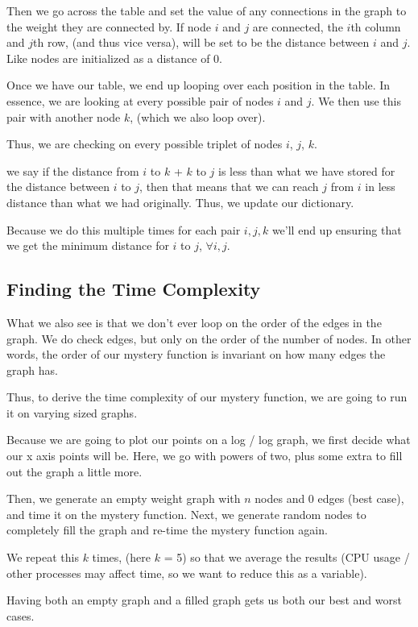 \documentclass{article}
\begin{document}
Then we go across the table and set the value of any connections in the graph to the weight they are connected by. If node $i$ and $j$ are connected, the $i$th column and $j$th row, (and thus vice versa), will be set to be the distance between $i$ and $j$. Like nodes are initialized as a distance of 0.

Once we have our table, we end up looping over each position in the table. In essence, we are looking at every possible pair of nodes $i$ and $j$. We then use this pair with another node $k$, (which we also loop over).

Thus, we are checking on every possible triplet of nodes $i$, $j$, $k$.

we say if the distance from $i$ to $k$ + $k$ to $j$ is less than what we have stored for the distance between $i$ to $j$, then that means that we can reach $j$ from $i$ in less distance than what we had originally. Thus, we update our dictionary.

Because we do this multiple times for each pair $i,j,k$ we'll end up ensuring that we get the minimum distance for $i$ to $j$, $\forall i, j$.

\subsection{Finding the Time Complexity}

What we also see is that we don't ever loop on the order of the edges in the graph. We do check edges, but only on the order of the number of nodes. In other words, the order of our mystery function is invariant on how many edges the graph has.

Thus, to derive the time complexity of our mystery function, we are going to run it on varying sized graphs.

Because we are going to plot our points on a log / log graph, we first decide what our x axis points will be. Here, we go with powers of two, plus some extra to fill out the graph a little more.

Then, we generate an empty weight graph with $n$ nodes and 0 edges (best case), and time it on the mystery function. Next, we generate random nodes to completely fill the graph and re-time the mystery function again.

We repeat this $k$ times, (here $k$ = 5) so that we average the results (CPU usage / other processes may affect time, so we want to reduce this as a variable).

Having both an empty graph and a filled graph gets us both our best and worst cases.
\end{document}
